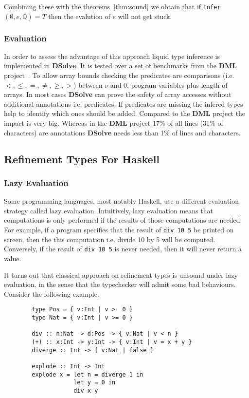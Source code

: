 \documentclass[a4paper,UKenglish]{lipics-v2016}
\begin{document}
Combining these with the theorems~\ref{thm:sound} we obtain that if \lstinline{Infer}$(\emptyset, e, \mathbb{Q}) = T$ then the evalution of $e$ will not get stuck.

\subsubsection{Evaluation}

In order to assess the advantage of this approach liquid type inference is implemented in \textbf{DSolve}.
It is tested over a set of benchmarks from the \textbf{DML} project~\cite{Xi:1998:EAB}.
To allow array bounds checking the predicates are comparisons (i.e. $<, \le, =, \neq, \geq, >$) between $\nu$ and 0, program variables plus length of arrays.
In most cases \textbf{DSolve} can prove the safety of array accesses without additional annotations i.e. predicates.
If predicates are missing the infered types help to identify which ones should be added.
Compared to the \textbf{DML} project the impact is very big.
Whereas in the \textbf{DML} project 17\% of all lines (31\% of characters) are annotations \textbf{DSolve} needs less than 1\% of lines and characters.


  \subsection{Refinement Types For Haskell}

    \subsubsection{Lazy Evaluation}

      Some programming languages, most notably Haskell, use a different
      evaluation strategy called lazy evaluation.  Intuitively, lazy evaluation
      means that computations is only performed if the results of those
      computations are needed.  For example, if a program specifies that the
      result of \texttt{div 10 5} be printed on screen, then the this
      computation i.e. divide 10 by 5 will be computed.  Conversely, if the
      result of \texttt{div 10 5} is never needed, then it will never return a
      value.  

      It turns out that classical approach on refinement types is unsound under
      lazy evaluation, in the sense that the typechecker will admit some bad
      behaviours.  Consider the following example.
      \begin{verbatim}
        type Pos = { v:Int | v >  0 }
        type Nat = { v:Int | v >= 0 }

        div :: n:Nat -> d:Pos -> { v:Nat | v < n } 
        (+) :: x:Int -> y:Int -> { v:Int | v = x + y }
        diverge :: Int -> { v:Nat | false } 

        explode :: Int -> Int
        explode x = let n = diverge 1 in 
                    let y = 0 in 
                    div x y
      \end{verbatim}
\end{document}
